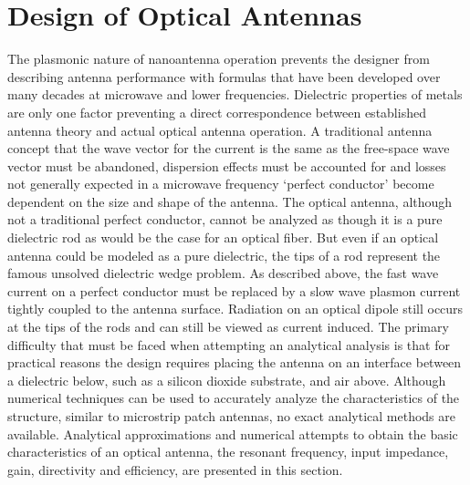 \section{Design of Optical Antennas}
%
The plasmonic nature of nanoantenna operation prevents the designer from describing antenna performance with formulas that have been developed over many decades at microwave and lower frequencies. Dielectric properties of metals are only one factor preventing a direct correspondence between established antenna theory and actual optical antenna operation. A traditional antenna concept that the wave vector for the current is the same as the free-space wave vector must be abandoned, dispersion effects must be accounted for and losses not generally expected in a microwave frequency  `perfect conductor' become dependent on the size and shape of the antenna.
The optical antenna, although not a traditional perfect conductor, cannot be analyzed as though it is a pure dielectric rod as would be the case for an optical fiber. But even if an optical antenna could be modeled as a pure dielectric, the tips of a rod represent the famous unsolved dielectric wedge problem. As described above, the fast wave current on a perfect conductor must be replaced by a slow wave plasmon current tightly coupled to the antenna surface. Radiation on an optical dipole still occurs at the tips of the rods and can still be viewed as current induced. The primary difficulty that must be faced when attempting an analytical analysis is that for practical reasons the design requires placing the antenna on an interface between a dielectric below, such as a silicon dioxide substrate, and air above. Although numerical techniques can be used to accurately analyze the characteristics of the structure, similar to microstrip patch antennas, no exact analytical methods are available. Analytical approximations and numerical attempts to obtain the basic characteristics of an optical antenna, the resonant frequency, input impedance, gain, directivity and efficiency, are presented in this section.
